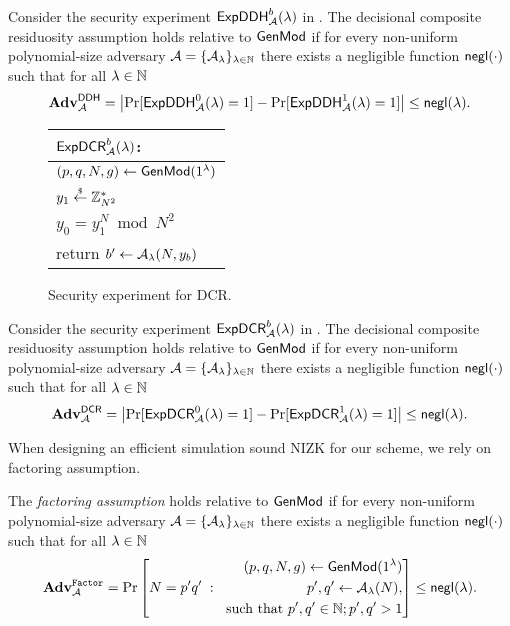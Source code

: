 \begin{definition}\label{thm:ddh}
Consider the security experiment $\mathsf{ExpDDH}_{\mathcal{A}}^{b}(\lambda)$ in .
The decisional composite residuosity assumption holds relative to $\mathsf{GenMod}$ if for every non-uniform polynomial-size adversary $\mathcal{A} = \{\mathcal{A}_{\lambda}\}_{\lambda \in \mathbb{N}}$ there exists a negligible function $\mathsf{negl}(\cdot)$ such that for all $\lambda \in \mathbb{N}$ 
\[\mathbf{Adv}^\mathsf{DDH}_{\mathcal{A}} = \left| \Pr[\mathsf{ExpDDH}_{\mathcal{A}}^{0}(\lambda) = 1] - \Pr[\mathsf{ExpDDH}_{\mathcal{A}}^{1}(\lambda) = 1] \right| \leq \mathsf{negl}(\lambda).\]
\end{definition} 

\begin{figure}[h]
\begin{center}
\begin{tabular}{l}
$\mathsf{ExpDCR}_{\mathcal{A}}^{b}(\lambda)$: \\
\hline
$(p, q, N, g) \leftarrow \mathsf{GenMod}(1{^{\lambda}})$ \\
$y_1 \stackrel{{\scriptscriptstyle\$}}{\leftarrow} \mathbb{Z}_{N^2}^*$ \\
$y_0 = y_1^N \bmod N^2$\\
return	$b' \leftarrow \mathcal{A}_{\lambda}(N,y_b)$
\end{tabular}
\end{center}
\caption{\label{fig:dcr}Security experiment for DCR.}
\end{figure}

\begin{definition}
Consider the security experiment $\mathsf{ExpDCR}_{\mathcal{A}}^{b}(\lambda)$ in .
The decisional composite residuosity assumption holds relative to $\mathsf{GenMod}$ if for every non-uniform polynomial-size adversary $\mathcal{A} = \{\mathcal{A}_{\lambda}\}_{\lambda \in \mathbb{N}}$ there exists a negligible function $\mathsf{negl}(\cdot)$ such that for all $\lambda \in \mathbb{N}$ 
\[\mathbf{Adv}^\mathsf{DCR}_{\mathcal{A}} = \left| \Pr[\mathsf{ExpDCR}_{\mathcal{A}}^{0}(\lambda) = 1] - \Pr[\mathsf{ExpDCR}_{\mathcal{A}}^{1}(\lambda) = 1] \right| \leq \mathsf{negl}(\lambda).\]
\end{definition} 


When designing an efficient simulation sound NIZK for our scheme, we rely on factoring assumption. 

\begin{definition}
The \emph{factoring assumption} holds relative to $\mathsf{GenMod}$ if  for every non-uniform polynomial-size adversary $\mathcal{A} = \{\mathcal{A}_{\lambda}\}_{\lambda \in \mathbb{N}}$ there exists a negligible function $\mathsf{negl}(\cdot)$ such that for all $\lambda \in \mathbb{N}$ 
\[ \mathbf{Adv}_{\mathcal{A}}^{\mathtt{Factor}} = 
\Pr\left[ 
		N = p'q'
		\;:\;
    \begin{aligned}
    	(p, q, N, g) \leftarrow \mathsf{GenMod}(1{^{\lambda}}) \\
			p',q' \leftarrow \mathcal{A}_{\lambda}(N), \\
			\text{ such that }  p', q' \in \mathbb{N}; p', q'>1
    \end{aligned}
    \right] 
\leq \mathsf{negl}(\lambda). 
\]
\end{definition}

